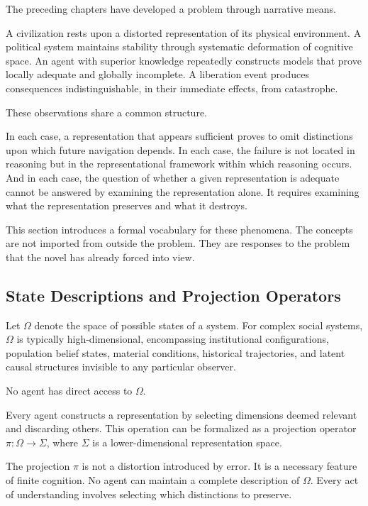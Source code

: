 \documentclass[12pt, a4paper]{article}
\theoremstyle{plain}
\theoremstyle{definition}
\theoremstyle{remark}
\begin{document}
The preceding chapters have developed a problem
through narrative means.

A civilization rests upon a distorted representation
of its physical environment. A political system
maintains stability through systematic deformation
of cognitive space. An agent with superior knowledge
repeatedly constructs models that prove locally
adequate and globally incomplete. A liberation event
produces consequences indistinguishable, in their
immediate effects, from catastrophe.

These observations share a common structure.

In each case, a representation that appears
sufficient proves to omit distinctions upon which
future navigation depends. In each case, the failure
is not located in reasoning but in the
representational framework within which reasoning
occurs. And in each case, the question of whether
a given representation is adequate cannot be
answered by examining the representation alone.
It requires examining what the representation
preserves and what it destroys.

This section introduces a formal vocabulary for
these phenomena. The concepts are not imported
from outside the problem. They are responses to
the problem that the novel has already forced
into view.

\subsection{State Descriptions and Projection Operators}

Let $\Omega$ denote the space of possible states
of a system. For complex social systems, $\Omega$
is typically high-dimensional, encompassing
institutional configurations, population belief
states, material conditions, historical trajectories,
and latent causal structures invisible to any
particular observer.

No agent has direct access to $\Omega$.

Every agent constructs a representation by selecting
dimensions deemed relevant and discarding others.
This operation can be formalized as a projection
operator $\pi: \Omega \to \Sigma$, where $\Sigma$
is a lower-dimensional representation space.

The projection $\pi$ is not a distortion introduced
by error. It is a necessary feature of finite
cognition. No agent can maintain a complete
description of $\Omega$. Every act of understanding
involves selecting which distinctions to preserve.
\end{document}
